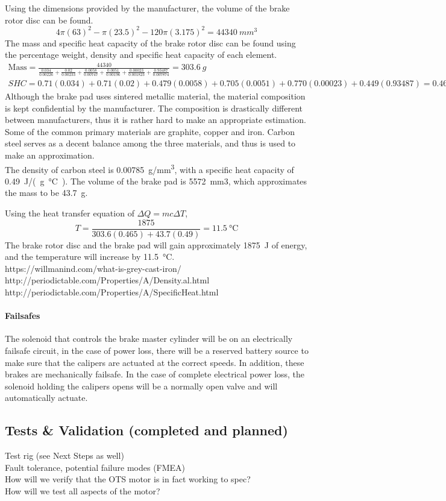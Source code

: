 \documentclass[main.tex]{subfiles}
\begin{document}
    Using the dimensions provided by the manufacturer, the volume of the brake rotor disc can be found.
    \[
    4\pi(63)^2-\pi(23.5)^2-120\pi(3.175)^2=\SI{44340}{mm^3}
    \]
    The mass and specific heat capacity of the brake rotor disc can be found using the percentage weight, density and specific heat capacity of each element.
    \begin{gather*}
    \mathrm{Mass} = \frac{44340}{\frac{0.034}{0.00226} + \frac{0.02}{0.00233} + \frac{0.0058}{0.00747} + \frac{0.0051}{0.00196} + \frac{0.00023}{0.001823} + \frac{0.93487}{0.007874}} = \SI{303.6}{g}\\
    \textit{SHC}=0.71(0.034)+0.71(0.02)+0.479(0.0058)+0.705(0.0051)+0.770(0.00023)+0.449(0.93487)=0.465
    \end{gather*}
    Although the brake pad uses sintered metallic material, the material composition is kept confidential by the manufacturer. The composition is drastically different between manufacturers, thus it is rather hard to make an appropriate estimation. Some of the common primary materials are graphite, copper and iron. Carbon steel serves as a decent balance among the three materials, and thus is used to make an approximation.\\

    The density of carbon steel is \SI{0.00785}{g/mm^3}, with a specific heat capacity of \SI{0.49}{J/(g\celsius)}. The volume of the brake pad is \SI{5572}{mm3}, which approximates the mass to be \SI{43.7}{g}.

    Using the heat transfer equation of $\Delta Q = mc \Delta T$,
    \[
    T=\frac{1875}{303.6(0.465)+43.7(0.49)}=\SI{11.5}{\celsius}
    \]
    The brake rotor disc and the brake pad will gain approximately \SI{1875}{J} of energy, and the temperature will increase by \SI{11.5}{\celsius}.\\

    https://willmanind.com/what-is-grey-cast-iron/\\
    http://periodictable.com/Properties/A/Density.al.html\\
    http://periodictable.com/Properties/A/SpecificHeat.html

    \paragraph{Failsafes}
    The solenoid that controls the brake master cylinder will be on an electrically failsafe circuit, in the case of power loss, there will be a reserved battery source to make sure that the calipers are actuated at the correct speeds. In addition, these brakes are mechanically failsafe. In the case of complete electrical power loss, the solenoid holding the calipers opens will be a normally open valve and will automatically actuate.

    \subsection{Tests \& Validation (completed and planned)}
    Test rig (see Next Steps as well)\\
    Fault tolerance, potential failure modes (FMEA)\\
    How will we verify that the OTS motor is in fact working to spec?\\
    How will we test all aspects of the motor?
\end{document}
